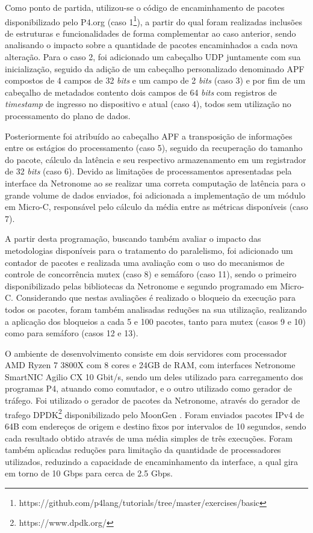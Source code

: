 \documentclass[12pt]{article}
\begin{document}
Como ponto de partida, utilizou-se o código de encaminhamento de pacotes disponibilizado pelo P4.org (caso 1\footnote{https://github.com/p4lang/tutorials/tree/master/exercises/basic}), a partir do qual foram realizadas inclusões de estruturas e funcionalidades de forma complementar ao caso anterior, sendo  analisando o impacto sobre a quantidade de pacotes encaminhados a cada nova alteração. Para o caso 2, foi adicionado um cabeçalho UDP juntamente com sua inicialização, seguido da adição de um cabeçalho personalizado denominado APF compostos de 4 campos de 32 \textit{bits} e um campo de 2 \textit{bits} (caso 3) e por fim de um cabeçalho de metadados contento dois campos de 64 \textit{bits} com registros de \textit{timestamp} de ingresso no dispositivo e atual (caso 4), todos sem utilização no processamento do plano de dados. 

Posteriormente foi atribuído ao cabeçalho APF a transposição de informações entre os estágios do processamento (caso 5), seguido da recuperação do tamanho do pacote, cálculo da latência e seu respectivo armazenamento em um registrador de 32 \textit{bits} (caso 6). Devido as limitações de processamentos apresentadas pela interface da Netronome ao se realizar uma correta computação de latência para o grande volume de dados enviados, foi adicionada a implementação de um módulo em Micro-C, responsável pelo cálculo da média entre as métricas disponíveis (caso 7).%

A partir desta programação, buscando também avaliar o impacto das metodologias disponíveis para o tratamento do paralelismo, foi adicionado um contador de pacotes e realizada uma avaliação com o uso do mecanismos de controle de concorrência mutex (caso 8) e semáforo (caso 11), sendo o primeiro disponibilizado pelas bibliotecas da Netronome e segundo programado em Micro-C. Considerando que nestas avaliações é realizado o bloqueio da execução para todos os pacotes, foram também analisadas reduções na sua utilização, realizando a aplicação dos bloqueios a cada 5 e 100 pacotes, tanto para mutex (casos 9 e 10) como para semáforo (casos 12 e 13).%

O ambiente de desenvolvimento consiste em dois servidores com processador AMD Ryzen 7 3800X com 8 cores e 24GB de RAM, com interfaces Netronome SmartNIC Agilio CX 10 Gbit/s, sendo um deles utilizado para carregamento dos programas P4, atuando como comutador, e o outro utilizado como gerador de tráfego. Foi utilizado o gerador de pacotes da Netronome, através do gerador de trafego DPDK\footnote{https://www.dpdk.org/} disponibilizado pelo MoonGen \cite{mg_14}. Foram enviados pacotes IPv4 de 64B com endereços de origem e destino fixos por intervalos de 10 segundos, sendo cada resultado obtido através de uma média simples de três execuções. Foram também aplicadas reduções para limitação da quantidade de processadores utilizados, reduzindo a capacidade de encaminhamento da interface, a qual gira em torno de 10 Gbps para cerca de 2.5 Gbps.
\end{document}

